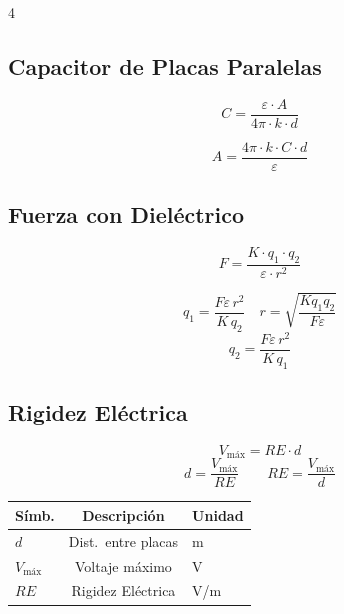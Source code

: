 \documentclass[9pt, landscape, letterpaper]{extarticle}
\begin{document}
\begin{multicols}{4}
  \subsection{Capacitor de Placas Paralelas}

  \begin{formulabox}
    $$C = \frac{\varepsilon \cdot A}{4\pi \cdot k \cdot d}$$
  \end{formulabox}

  \begin{despejesbox}[Despeje]
    $$A = \frac{4\pi \cdot k \cdot C \cdot d}{\varepsilon}$$
  \end{despejesbox}

  \subsection{Fuerza con Dieléctrico}

  \begin{formulabox}
    $$F = \frac{K \cdot q_1 \cdot q_2}{\varepsilon \cdot r^2}$$
  \end{formulabox}

  \begin{despejesbox}[Despejes]
    $$q_1 = \frac{F \varepsilon\, r^2}{K\, q_2} \quad r = \sqrt{\frac{K q_1 q_2}{F \varepsilon}}$$
    $$q_2 = \frac{F \varepsilon\, r^2}{K\, q_1}$$
  \end{despejesbox}

  \subsection{Rigidez Eléctrica}

  \begin{formulabox}
    $$V_{\text{máx}} = RE \cdot d$$
    $$d = \frac{V_{\text{máx}}}{RE} \qquad RE = \frac{V_{\text{máx}}}{d}$$
  \end{formulabox}

  \begin{tablabox}[Variables]
    \tablacompacta
    \begin{tabular}{@{}lcl@{}}
      \toprule
      Símb.            & Descripción         & Unidad \\
      \midrule
      $d$              & Dist.\ entre placas & m      \\
      $V_{\text{máx}}$ & Voltaje máximo      & V      \\
      $RE$             & Rigidez Eléctrica   & V/m    \\
      \bottomrule
    \end{tabular}
  \end{tablabox}


\end{multicols}
\end{document}
